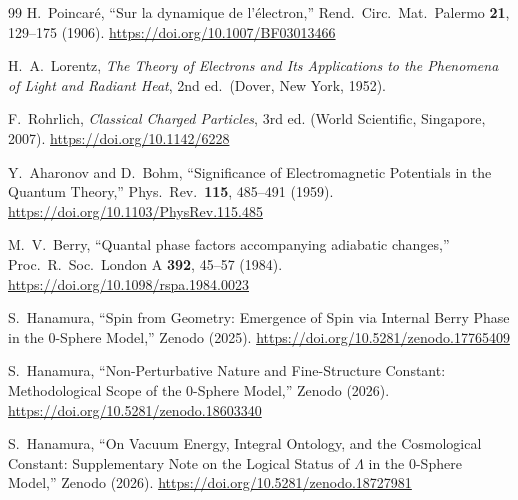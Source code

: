 \documentclass[12pt,a4paper]{article}
\begin{document}
\begin{thebibliography}{99}
H.~Poincar\'e,
``Sur la dynamique de l'\'electron,''
Rend.\ Circ.\ Mat.\ Palermo \textbf{21}, 129--175 (1906).
\href{https://doi.org/10.1007/BF03013466}{https://doi.org/10.1007/BF03013466}

H.~A.~Lorentz,
\textit{The Theory of Electrons and Its Applications to the Phenomena of Light and Radiant Heat},
2nd ed.\ (Dover, New York, 1952).

F.~Rohrlich,
\textit{Classical Charged Particles}, 3rd ed.
(World Scientific, Singapore, 2007).
\href{https://doi.org/10.1142/6228}{https://doi.org/10.1142/6228}

Y.~Aharonov and D.~Bohm,
``Significance of Electromagnetic Potentials in the Quantum Theory,''
Phys.\ Rev.\ \textbf{115}, 485--491 (1959).
\href{https://doi.org/10.1103/PhysRev.115.485}{https://doi.org/10.1103/PhysRev.115.485}

M.~V.~Berry,
``Quantal phase factors accompanying adiabatic changes,''
Proc.\ R.\ Soc.\ London A \textbf{392}, 45--57 (1984).
\href{https://doi.org/10.1098/rspa.1984.0023}{https://doi.org/10.1098/rspa.1984.0023}

S.~Hanamura,
``Spin from Geometry: Emergence of Spin via Internal Berry Phase in the 0-Sphere Model,''
Zenodo (2025).
\href{https://doi.org/10.5281/zenodo.17765409}{https://doi.org/10.5281/zenodo.17765409}

S.~Hanamura,
``Non-Perturbative Nature and Fine-Structure Constant: Methodological Scope of the 0-Sphere Model,''
Zenodo (2026).
\href{https://doi.org/10.5281/zenodo.18603340}{https://doi.org/10.5281/zenodo.18603340}

S.~Hanamura,
``On Vacuum Energy, Integral Ontology, and the Cosmological Constant: Supplementary Note on the Logical Status of $\Lambda$ in the 0-Sphere Model,''
Zenodo (2026).
\href{https://doi.org/10.5281/zenodo.18727981}{https://doi.org/10.5281/zenodo.18727981}

\end{thebibliography}
\end{document}
